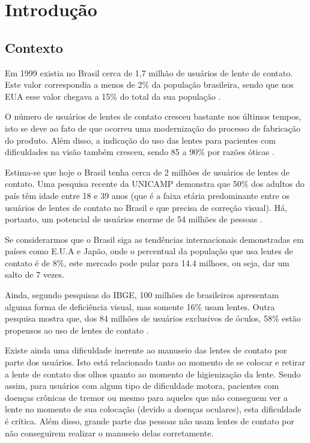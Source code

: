 \chapter[Introdução]{Introdução}



\section[Contexto]{Contexto}

Em 1999 existia no Brasil cerca de 1,7 milhão de usuários de lente de contato. Este valor correspondia a menos de 2\% da população brasileira, sendo que nos EUA esse valor chegava a 15\% do total da sua população \cite{ghanem}.

O número de usuários de lentes de contato cresceu bastante nos últimos tempos, isto se deve ao fato de que ocorreu uma modernização do processo de fabricação do produto. Além disso, a indicação do uso das lentes para pacientes com dificuldades na visão também cresceu, sendo 85 a 90\% por razões óticas \cite{lui}. 

Estima-se que hoje o Brasil tenha cerca de 2 milhões de usuários de lentes de contato. Uma pesquisa recente da UNICAMP demonstra que 50\% dos adultos do país têm idade entre 18 e 39 anos (que é a faixa etária predominante entre os usuários de lentes de contato no Brasil e que precisa de correção visual). Há, portanto, um potencial de usuários enorme de 54 milhões de pessoas \cite{estimativas}.

Se considerarmos que o Brasil siga as tendências internacionais demonstradas em países como E.U.A e Japão, onde o percentual da população que usa lentes de contato é de 8\%, este mercado pode pular para 14.4 milhoes, ou seja, dar um salto de 7 vezes.

Ainda, segundo pesquisas do IBGE, 100 milhões de brasileiros apresentam alguma forma de deficiência visual, mas somente 16\% usam lentes. Outra pesquisa mostra que, dos 84 milhões de usuários exclusivos de óculos, 58\% estão propensos ao uso de lentes de contato \cite{estimativas}.

Existe ainda uma dificuldade inerente ao manuseio das lentes de contato por parte dos usuários. Isto está relacionado tanto ao momento de se colocar e retirar a lente de contato dos olhos quanto ao momento de higienização da lente. Sendo assim, para usuários com algum tipo de dificuldade motora, pacientes com doenças crônicas de tremor ou mesmo para aqueles que não conseguem ver a lente no momento de sua colocação (devido a doenças oculares), esta dificuldade é crítica. Além disso, grande parte das pessoas não usam lentes de contato por não conseguirem realizar o manuseio delas corretamente. 


